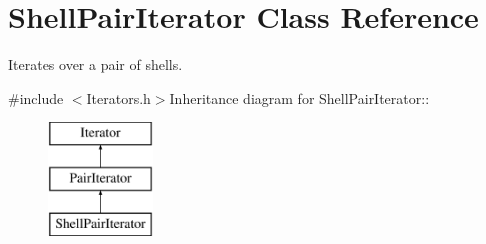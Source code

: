 \hypertarget{classJKBuilder_1_1ShellPairIterator}{
\section{ShellPairIterator Class Reference}
\label{classJKBuilder_1_1ShellPairIterator}
}


Iterates over a pair of shells.  


{\ttfamily \#include $<$Iterators.h$>$}Inheritance diagram for ShellPairIterator::\begin{figure}[H]
\begin{center}
\leavevmode
\includegraphics[height=3cm]{classJKBuilder_1_1ShellPairIterator}
\end{center}
\end{figure}
